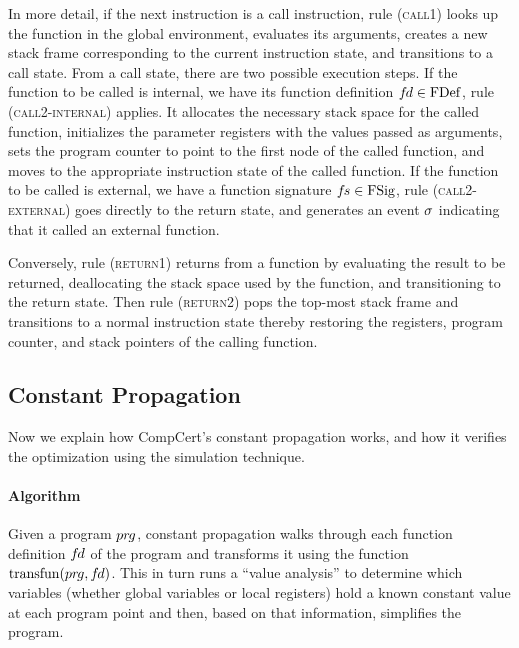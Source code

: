 In more detail, if the next instruction is a call instruction, rule (\textsc{call1}) looks up the
function in the global environment, evaluates its arguments, creates a new stack frame corresponding
to the current instruction state, and transitions to a call state.  From a call state, there are two
possible execution steps.  If the function to be called is internal, \ie we have its function
definition ${f\hspace*{-1pt}d}\in\mathrm{FDef}$, rule (\textsc{call2-internal}) applies.  It allocates the necessary
stack space for the called function, initializes the parameter registers with the values passed as
arguments, sets the program counter to point to the first node of the called function, and moves to
the appropriate instruction state of the called function.  If the function to be called is external,
\ie we have a function signature ${f\hspace*{-1pt}s}\in\mathrm{FSig}$, rule (\textsc{call2-external}) goes directly to
the return state, and generates an event $\sigma$ indicating that it called an external function.

Conversely, rule (\textsc{return1}) returns from a function by evaluating the result to be returned,
deallocating the stack space used by the function, and transitioning to the return state.  Then rule
(\textsc{return2}) pops the top-most stack frame and transitions to a normal instruction state
thereby restoring the registers, program counter, and stack pointers of the calling function.



\subsection{Constant Propagation}
\label{sec:background:constprop}

Now we explain how CompCert's constant propagation works, and how it verifies the optimization using
the simulation technique.

\paragraph{Algorithm}

Given a program ${pr\hspace*{-1pt}g}$, constant propagation walks through each function definition ${f\hspace*{-1pt}d}$ of the program 
and transforms it using the function $\mathrm{transfun}({pr\hspace*{-1pt}g}, {f\hspace*{-1pt}d})$.
This in turn runs a ``value analysis'' to determine which variables (whether global variables or local registers) hold a known constant value at each program point
and then, based on that information, simplifies the program.

